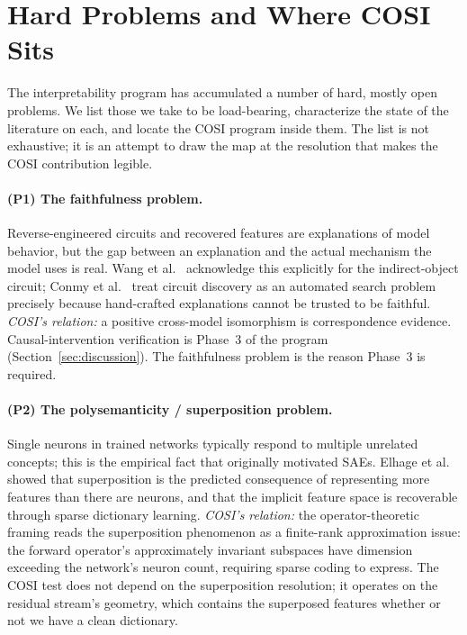 \section{Hard Problems and Where COSI Sits}
\label{sec:hardproblems}

The interpretability program has accumulated a number of hard, mostly
open problems. We list those we take to be load-bearing, characterize
the state of the literature on each, and locate the COSI program inside
them. The list is not exhaustive; it is an attempt to draw the map at
the resolution that makes the COSI contribution legible.

\paragraph{(P1) The faithfulness problem.}
Reverse-engineered circuits and recovered features are explanations of
model behavior, but the gap between an explanation and the actual
mechanism the model uses is real. Wang et al.~\cite{wang2023interpretability}
acknowledge this explicitly for the indirect-object circuit; Conmy et
al.~\cite{conmy2023towards} treat circuit discovery as an automated
search problem precisely because hand-crafted explanations cannot be
trusted to be faithful. \emph{COSI's relation:} a positive cross-model
isomorphism is correspondence evidence. Causal-intervention
verification is Phase~3 of the program (Section~\ref{sec:discussion}).
The faithfulness problem is the reason Phase~3 is required.

\paragraph{(P2) The polysemanticity / superposition problem.}
Single neurons in trained networks typically respond to multiple
unrelated concepts; this is the empirical fact that originally
motivated SAEs. Elhage et al.~\cite{elhage2022superposition} showed
that superposition is the predicted consequence of representing more
features than there are neurons, and that the implicit feature space is
recoverable through sparse dictionary learning. \emph{COSI's relation:}
the operator-theoretic framing reads the superposition phenomenon as a
finite-rank approximation issue: the forward operator's approximately
invariant subspaces have dimension exceeding the network's neuron
count, requiring sparse coding to express. The COSI test does not
depend on the superposition resolution; it operates on the residual
stream's geometry, which contains the superposed features whether or
not we have a clean dictionary.

